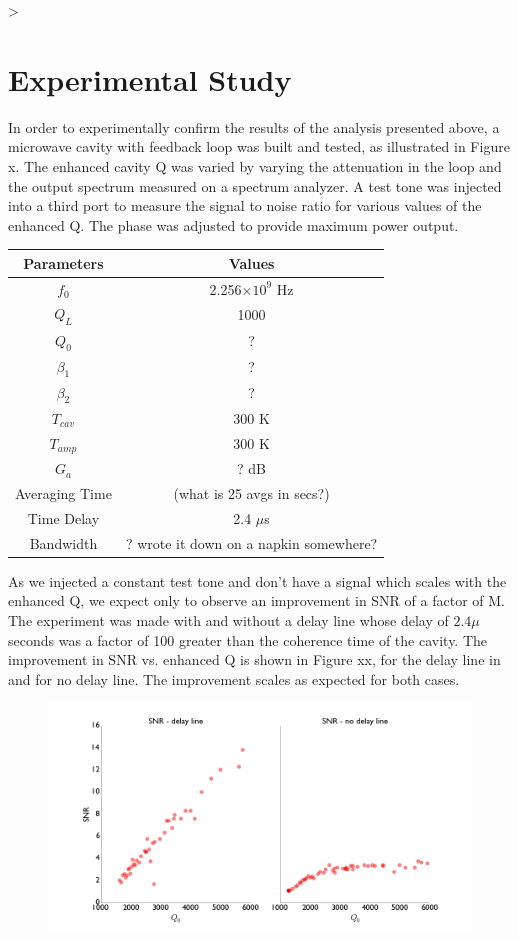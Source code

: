 >\documentclass[aps,prl,twocolumn,groupedaddress]{revtex4-1}
\begin{document}
\section{Experimental Study}
In order to experimentally confirm the results of the analysis presented above, a microwave cavity with feedback loop was built and tested, as illustrated in Figure x. The enhanced cavity Q was varied by varying the attenuation in the loop and the output spectrum measured on a spectrum analyzer. A test tone was injected into a third port to measure the signal to noise ratio for various values of the enhanced Q. The phase was adjusted to provide maximum power output.

\begin{tabular}{|c|c|}
\hline
Parameters & Values \\ \hline
$f_0$ & 2.256$\times 10^9$ Hz \\
$Q_L$ & 1000 \\
$Q_0$ & ? \\
$\beta_1$ & ? \\
$\beta_2$ & ? \\
$T_{cav}$ & 300 K \\
$T_{amp}$ & 300 K \\
$G_a$ & ? dB \\
Averaging Time & (what is 25 avgs in secs?) \\
Time Delay & 2.4 $\mu$s \\
Bandwidth & ? wrote it down on a napkin somewhere? \\
\hline
\end{tabular}

As we injected a constant test tone and don't have a signal which scales with the enhanced Q, we expect only to observe an improvement in SNR of a factor of M.
The experiment was made with and without a delay line whose delay of $2.4\mu$seconds was a factor of 100 greater than the coherence time of the cavity. The improvement in SNR vs. enhanced Q is shown in Figure xx, for the delay line in and for no delay line. The improvement scales as expected for both cases.
\begin{figure}[htbp]
\centering
\includegraphics[width=\textwidth]{figs/summary_plots}
\caption{}
\label{fig:summary_plots}
\end{figure}
\end{document}
